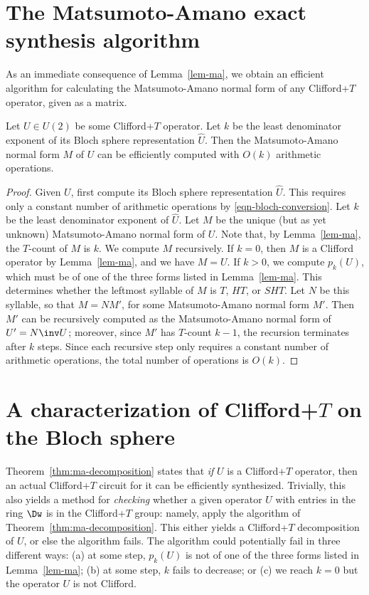 \documentclass{article}
\begin{document}
\section{The Matsumoto-Amano exact synthesis algorithm}

As an immediate consequence of Lemma~\ref{lem-ma}, we obtain an
efficient algorithm for calculating the Matsumoto-Amano normal form of
any Clifford+$T$ operator, given as a matrix.

\begin{theorem}\label{thm:ma-decomposition}
  Let $U\in U(2)$ be some Clifford+$T$ operator. Let $k$ be the least
  denominator exponent of its Bloch sphere representation $\hat U$.
  Then the Matsumoto-Amano normal form $M$ of $U$ can be efficiently
  computed with $O(k)$ arithmetic operations.
\end{theorem}

\begin{proof}
  Given $U$, first compute its Bloch sphere representation $\hat
  U$. This requires only a constant number of arithmetic operations by
  {\eqref{eqn-bloch-conversion}}. Let $k$ be the least denominator
  exponent of $\hat U$.  Let $M$ be the unique (but as yet unknown)
  Matsumoto-Amano normal form of $U$. Note that, by
  Lemma~\ref{lem-ma}, the $T$-count of $M$ is $k$. We compute $M$
  recursively. If $k=0$, then $M$ is a Clifford operator by
  Lemma~\ref{lem-ma}, and we have $M=U$. If $k>0$, we compute
  $p_k(U)$, which must be of one of the three forms listed
  in Lemma~\ref{lem-ma}. This determines whether the leftmost syllable
  of $M$ is $T$, $HT$, or $SHT$. Let $N$ be this syllable, so that
  $M=NM'$, for some Matsumoto-Amano normal form $M'$. Then $M'$ can be
  recursively computed as the Matsumoto-Amano normal form of $U'=
  N\inv U$; moreover, since $M'$ has $T$-count $k-1$, the recursion
  terminates after $k$ steps. Since each recursive step only requires
  a constant number of arithmetic operations, the total number of
  operations is $O(k)$.
\end{proof}

\section{A characterization of Clifford+$T$ on the Bloch sphere}

Theorem~\ref{thm:ma-decomposition} states that {\em if} $U$ is a
Clifford+$T$ operator, then an actual Clifford+$T$ circuit for it can
be efficiently synthesized. Trivially, this also yields a method for
{\em checking} whether a given operator $U$ with entries in the ring
$\Dw$ is in the Clifford+$T$ group: namely, apply the algorithm of
Theorem~\ref{thm:ma-decomposition}. This either yields a Clifford+$T$
decomposition of $U$, or else the algorithm fails. The algorithm could
potentially fail in three different ways: (a) at some step, $p_k(U)$
is not of one of the three forms listed in Lemma~\ref{lem-ma}; (b) at
some step, $k$ fails to decrease; or (c) we reach $k=0$ but the
operator $U$ is not Clifford.
\end{document}
